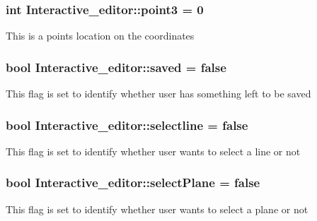 \subsubsection[{\texorpdfstring{point3}{point3}}]{\setlength{\rightskip}{0pt plus 5cm}int Interactive\+\_\+editor\+::point3 = 0}\hypertarget{classInteractive__editor_a9b368072fc0a220476d21079b4bcb739}{}\label{classInteractive__editor_a9b368072fc0a220476d21079b4bcb739}
This is a point\textquotesingle{}s location on the coordinates 
\subsubsection[{\texorpdfstring{saved}{saved}}]{\setlength{\rightskip}{0pt plus 5cm}bool Interactive\+\_\+editor\+::saved = false}\hypertarget{classInteractive__editor_a2e6cd28cc09c6250bb5aa720acfc16a4}{}\label{classInteractive__editor_a2e6cd28cc09c6250bb5aa720acfc16a4}
This flag is set to identify whether user has something left to be saved 
\subsubsection[{\texorpdfstring{selectline}{selectline}}]{\setlength{\rightskip}{0pt plus 5cm}bool Interactive\+\_\+editor\+::selectline = false}\hypertarget{classInteractive__editor_ad2e77097ff1ba602c3cdca2905febea7}{}\label{classInteractive__editor_ad2e77097ff1ba602c3cdca2905febea7}
This flag is set to identify whether user wants to select a line or not 
\subsubsection[{\texorpdfstring{select\+Plane}{selectPlane}}]{\setlength{\rightskip}{0pt plus 5cm}bool Interactive\+\_\+editor\+::select\+Plane = false}\hypertarget{classInteractive__editor_a9da61abe038ee33f9d15ef4a028dc8ab}{}\label{classInteractive__editor_a9da61abe038ee33f9d15ef4a028dc8ab}
This flag is set to identify whether user wants to select a plane or not 
